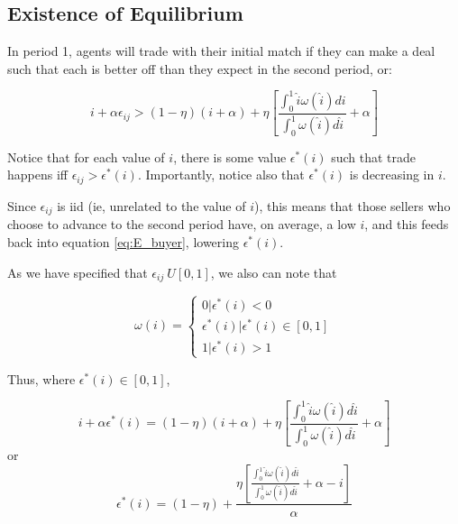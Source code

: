 \documentclass[WP]{AEA}
\begin{document}
\subsection{Existence of Equilibrium}

In period 1, agents will trade with their initial match if they can make a deal such that each is better off than they expect in the second period, or:

\begin{equation} \label{eq:ec_condition_raw}
 i+\alpha \epsilon_{ij} >(1-\eta)(i+\alpha ) + \eta  \left[ \frac{\int_0^1 \hat{i} \omega(\hat{i}) di}{\int_0^1  \omega(\hat{i}) d\hat{i}} + \alpha \right] 
 \end{equation}

Notice that for each value of $i$, there is some value $\epsilon^* (i)$ such that trade happens iff $\epsilon_{ij} > \epsilon^* (i)$.  Importantly, notice also that $\epsilon^* (i)$ is decreasing in $i$.

Since $\epsilon_{ij}$ is iid (ie, unrelated to the value of $i$), this means that those sellers who choose to advance to the second period have, on average, a low $i$, and this feeds back into equation \ref{eq:E_buyer}, lowering  $\epsilon^* (i)$. 


As we have specified that $\epsilon_{ij} ~ U[0,1]$, we also can note that 

\begin{equation} \label{eq:omega_epsilon}
\omega(i) =
	\begin{cases}
		0 |  \epsilon^* (i) < 0 \\
		\epsilon^* (i) | \epsilon^* (i) \in [0,1] \\
		1 |  \epsilon^* (i) > 1
	\end{cases}
\end{equation}



Thus, where $ \epsilon^* (i) \in [0,1]$,

\begin{equation}
 i+\alpha \epsilon^*(i) = (1-\eta)(i+\alpha ) + \eta  \left[ \frac{\int_0^1 \hat{i} \omega(\hat{i}) d\hat{i}}{\int_0^1  \omega(\hat{i}) d\hat{i}} + \alpha \right] 
\end{equation}
or
\begin{equation} \label{eq:e_star_unsolved}
 \epsilon^*(i) = (1-\eta) + \frac{   \eta \left[ \frac{\int_0^1 \hat{i} \omega(\hat{i}) d\hat{i}}{\int_0^1  \omega(\hat{i}) d\hat{i}} + \alpha -i \right] }{\alpha} 
\end{equation}
\end{document}
